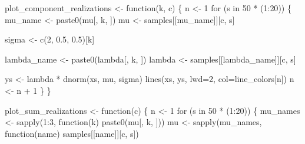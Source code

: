 \documentclass[
  letterpaper,
  DIV=11,
  numbers=noendperiod]{scrartcl}
\newenvironment{Shaded}{\begin{snugshade}}{\end{snugshade}}
\newcommand{\AttributeTok}[1]{\textcolor[rgb]{0.40,0.45,0.13}{#1}}
\newcommand{\ControlFlowTok}[1]{\textcolor[rgb]{0.00,0.23,0.31}{#1}}
\newcommand{\DecValTok}[1]{\textcolor[rgb]{0.68,0.00,0.00}{#1}}
\newcommand{\FloatTok}[1]{\textcolor[rgb]{0.68,0.00,0.00}{#1}}
\newcommand{\FunctionTok}[1]{\textcolor[rgb]{0.28,0.35,0.67}{#1}}
\newcommand{\NormalTok}[1]{\textcolor[rgb]{0.00,0.23,0.31}{#1}}
\newcommand{\OtherTok}[1]{\textcolor[rgb]{0.00,0.23,0.31}{#1}}
\newcommand{\SpecialCharTok}[1]{\textcolor[rgb]{0.37,0.37,0.37}{#1}}
\newcommand{\StringTok}[1]{\textcolor[rgb]{0.13,0.47,0.30}{#1}}
\begin{document}
\begin{Shaded}
\begin{Highlighting}[]
\NormalTok{plot\_component\_realizations }\OtherTok{\textless{}{-}} \ControlFlowTok{function}\NormalTok{(k, c) \{}
\NormalTok{  n }\OtherTok{\textless{}{-}} \DecValTok{1}
  \ControlFlowTok{for}\NormalTok{ (s }\ControlFlowTok{in} \DecValTok{50} \SpecialCharTok{*}\NormalTok{ (}\DecValTok{1}\SpecialCharTok{:}\DecValTok{20}\NormalTok{)) \{}
\NormalTok{    mu\_name }\OtherTok{\textless{}{-}} \FunctionTok{paste0}\NormalTok{(}\StringTok{\textquotesingle{}mu[\textquotesingle{}}\NormalTok{, k, }\StringTok{\textquotesingle{}]\textquotesingle{}}\NormalTok{)}
\NormalTok{    mu }\OtherTok{\textless{}{-}}\NormalTok{ samples[[mu\_name]][c, s]}

\NormalTok{    sigma }\OtherTok{\textless{}{-}} \FunctionTok{c}\NormalTok{(}\DecValTok{2}\NormalTok{, }\FloatTok{0.5}\NormalTok{, }\FloatTok{0.5}\NormalTok{)[k]}

\NormalTok{    lambda\_name }\OtherTok{\textless{}{-}} \FunctionTok{paste0}\NormalTok{(}\StringTok{\textquotesingle{}lambda[\textquotesingle{}}\NormalTok{, k, }\StringTok{\textquotesingle{}]\textquotesingle{}}\NormalTok{)}
\NormalTok{    lambda }\OtherTok{\textless{}{-}}\NormalTok{ samples[[lambda\_name]][c, s]}

\NormalTok{    ys }\OtherTok{\textless{}{-}}\NormalTok{ lambda }\SpecialCharTok{*} \FunctionTok{dnorm}\NormalTok{(xs, mu, sigma)}
    \FunctionTok{lines}\NormalTok{(xs, ys, }\AttributeTok{lwd=}\DecValTok{2}\NormalTok{, }\AttributeTok{col=}\NormalTok{line\_colors[n])}
\NormalTok{    n }\OtherTok{\textless{}{-}}\NormalTok{ n }\SpecialCharTok{+} \DecValTok{1}
\NormalTok{  \}}
\NormalTok{\}}

\NormalTok{plot\_sum\_realizations }\OtherTok{\textless{}{-}} \ControlFlowTok{function}\NormalTok{(c) \{}
\NormalTok{  n }\OtherTok{\textless{}{-}} \DecValTok{1}
  \ControlFlowTok{for}\NormalTok{ (s }\ControlFlowTok{in} \DecValTok{50} \SpecialCharTok{*}\NormalTok{ (}\DecValTok{1}\SpecialCharTok{:}\DecValTok{20}\NormalTok{)) \{}
\NormalTok{    mu\_names }\OtherTok{\textless{}{-}} \FunctionTok{sapply}\NormalTok{(}\DecValTok{1}\SpecialCharTok{:}\DecValTok{3}\NormalTok{, }\ControlFlowTok{function}\NormalTok{(k) }\FunctionTok{paste0}\NormalTok{(}\StringTok{\textquotesingle{}mu[\textquotesingle{}}\NormalTok{, k, }\StringTok{\textquotesingle{}]\textquotesingle{}}\NormalTok{))}
\NormalTok{    mu }\OtherTok{\textless{}{-}} \FunctionTok{sapply}\NormalTok{(mu\_names, }\ControlFlowTok{function}\NormalTok{(name) samples[[name]][c, s])}


\end{Highlighting}
\end{Shaded}
\end{document}
